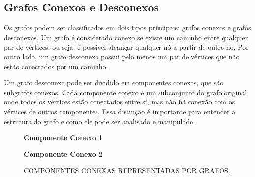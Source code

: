 \subsection{Grafos Conexos e Desconexos}

Os grafos podem ser classificados em dois tipos principais: grafos conexos e grafos desconexos. Um grafo é considerado conexo se existe um caminho entre qualquer par de vértices, ou seja, é possível alcançar qualquer nó a partir de outro nó. Por outro lado, um grafo desconexo possui pelo menos um par de vértices que não estão conectados por um caminho.

Um grafo desconexo pode ser dividido em componentes conexos, que são subgrafos conexos. Cada componente conexo é um subconjunto do grafo original onde todos os vértices estão conectados entre si, mas não há conexão com os vértices de outros componentes. Essa distinção é importante para entender a estrutura do grafo e como ele pode ser analisado e manipulado.


\begin{figure}[ht]
    \caption{COMPONENTES CONEXAS REPRESENTADAS POR GRAFOS.}
    \centering
    \begin{minipage}{0.45\textwidth}
        \centering
        \textbf{Componente Conexo 1} \\[0.2cm]
    \end{minipage}
    \hfill
    \begin{minipage}{0.45\textwidth}
        \centering
        \textbf{Componente Conexo 2} \\[0.2cm]
    \end{minipage}
    \label{fig:componentes_conexos}
    \end{figure}

